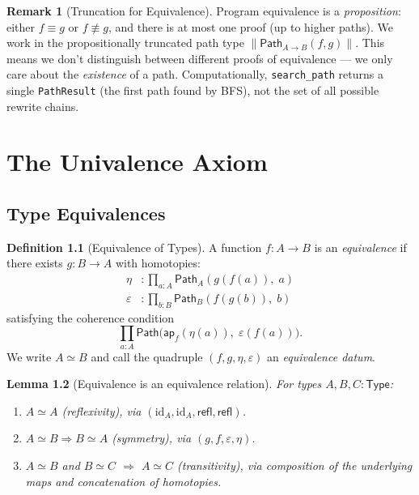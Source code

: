 \documentclass[11pt,a4paper]{report}
\theoremstyle{definition}
\newtheorem{definition}{Definition}[chapter]
\newtheorem{remark}[definition]{Remark}
\theoremstyle{plain}
\newtheorem{lemma}[definition]{Lemma}
\newcommand{\Path}{\mathsf{Path}}
\newcommand{\Type}{\mathsf{Type}}
\begin{document}
\begin{remark}[Truncation for Equivalence]
Program equivalence is a \emph{proposition}: either $f \equiv g$ or
$f \not\equiv g$, and there is at most one proof (up to higher paths).
We work in the propositionally truncated path type
$\|\Path_{A \to B}(f, g)\|$.  This means we don't distinguish between
different proofs of equivalence --- we only care about the
\emph{existence} of a path.  Computationally, \texttt{search\_path}
returns a single \texttt{PathResult} (the first path found by BFS),
not the set of all possible rewrite chains.
\end{remark}


\chapter{The Univalence Axiom}
\label{ch:univalence}

\section{Type Equivalences}

\begin{definition}[Equivalence of Types]
\label{def:type-equiv}
A function $f : A \to B$ is an \emph{equivalence} if there exists
$g : B \to A$ with homotopies:
\begin{align}
  \eta &: \prod_{a : A} \Path_A(g(f(a)),\; a) \label{eq:equiv-sect}\\
  \varepsilon &: \prod_{b : B} \Path_B(f(g(b)),\; b) \label{eq:equiv-retr}
\end{align}
satisfying the coherence condition
\[
  \prod_{a : A} \Path\!\bigl(\mathsf{ap}_f(\eta(a)),\;
  \varepsilon(f(a))\bigr).
\]
We write $A \simeq B$ and call the quadruple $(f, g, \eta, \varepsilon)$
an \emph{equivalence datum}.
\end{definition}

\begin{lemma}[Equivalence is an equivalence relation]
\label{lem:equiv-eqrel}
For types $A, B, C : \Type$:
\begin{enumerate}[label=(\roman*)]
  \item $A \simeq A$ \emph{(reflexivity)}, via $(\mathrm{id}_A, \mathrm{id}_A, \mathsf{refl}, \mathsf{refl})$.
  \item $A \simeq B \Rightarrow B \simeq A$ \emph{(symmetry)}, via $(g, f, \varepsilon, \eta)$.
  \item $A \simeq B$ and $B \simeq C$ $\Rightarrow$ $A \simeq C$ \emph{(transitivity)},
    via composition of the underlying maps and concatenation of homotopies.
\end{enumerate}
\end{lemma}
\end{document}
